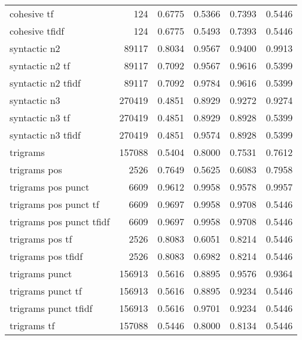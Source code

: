\documentclass{article}
\begin{document}
\begin{table}
\begin{tabular}{lrrrrr}
cohesive tf                &    124 & 0.6775 &       0.5366 &         0.7393 &               0.5446 \\
cohesive tfidf             &    124 & 0.6775 &       0.5493 &         0.7393 &               0.5446 \\
syntactic n2               &  89117 & 0.8034 &       0.9567 &         0.9400 &               0.9913 \\
syntactic n2 tf            &  89117 & 0.7092 &       0.9567 &         0.9616 &               0.5399 \\
syntactic n2 tfidf         &  89117 & 0.7092 &       0.9784 &         0.9616 &               0.5399 \\
syntactic n3               & 270419 & 0.4851 &       0.8929 &         0.9272 &               0.9274 \\
syntactic n3 tf            & 270419 & 0.4851 &       0.8929 &         0.8928 &               0.5399 \\
syntactic n3 tfidf         & 270419 & 0.4851 &       0.9574 &         0.8928 &               0.5399 \\
trigrams                   & 157088 & 0.5404 &       0.8000 &         0.7531 &               0.7612 \\
trigrams pos               &   2526 & 0.7649 &       0.5625 &         0.6083 &               0.7958 \\
trigrams pos punct         &   6609 & 0.9612 &       0.9958 &         0.9578 &               0.9957 \\
trigrams pos punct tf      &   6609 & 0.9697 &       0.9958 &         0.9708 &               0.5446 \\
trigrams pos punct tfidf   &   6609 & 0.9697 &       0.9958 &         0.9708 &               0.5446 \\
trigrams pos tf            &   2526 & 0.8083 &       0.6051 &         0.8214 &               0.5446 \\
trigrams pos tfidf         &   2526 & 0.8083 &       0.6982 &         0.8214 &               0.5446 \\
trigrams punct             & 156913 & 0.5616 &       0.8895 &         0.9576 &               0.9364 \\
trigrams punct tf          & 156913 & 0.5616 &       0.8895 &         0.9234 &               0.5446 \\
trigrams punct tfidf       & 156913 & 0.5616 &       0.9701 &         0.9234 &               0.5446 \\
trigrams tf                & 157088 & 0.5446 &       0.8000 &         0.8134 &               0.5446 \\

\end{tabular}
\end{table}
\end{document}
